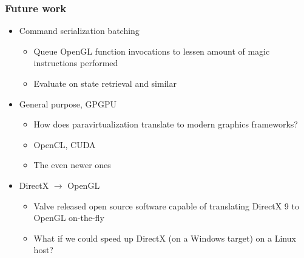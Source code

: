 \begin{frame}

\frametitle{Future work}

\begin{itemize}
  \item Command serialization batching \begin{itemize}\item Queue OpenGL function invocations to lessen amount of magic instructions performed \item Evaluate on state retrieval and similar\end{itemize}
  \item General purpose, GPGPU \begin{itemize}\item How does paravirtualization translate to modern graphics frameworks? \item OpenCL, CUDA \item The even newer ones\end{itemize}
  \item DirectX $\rightarrow$ OpenGL \begin{itemize}\item Valve released open source software capable of translating DirectX 9 to OpenGL on-the-fly \item What if we could speed up DirectX (on a Windows target) on a Linux host?\end{itemize}
\end{itemize}

\end{frame}
